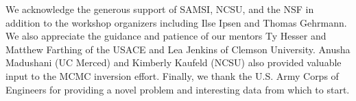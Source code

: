 We acknowledge the generous support of SAMSI, NCSU, and the NSF in addition to the workshop organizers including Ilse Ipsen and Thomas Gehrmann. We also appreciate the guidance and patience of our mentors Ty Hesser and Matthew Farthing of the USACE and Lea Jenkins of Clemson University. Anusha Madushani (UC Merced) and Kimberly Kaufeld (NCSU) also provided valuable input to the MCMC inversion effort. Finally, we thank the U.S. Army Corps of Engineers for providing a novel problem and interesting data from which to start. 